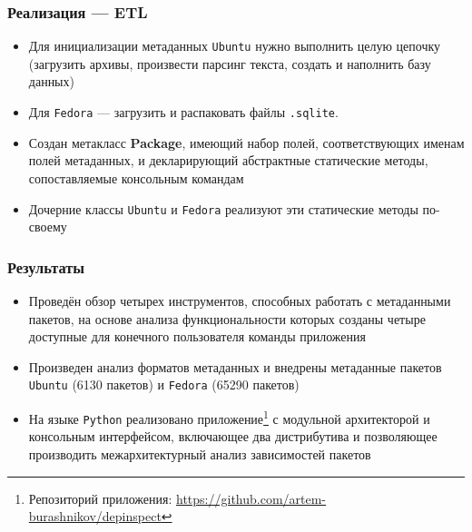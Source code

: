 \documentclass{beamer}
\begin{document}


\begin{frame}[t]
	\frametitle{Реализация --- ETL}
	\begin{itemize}
		\item Для инициализации метаданных \texttt{Ubuntu} нужно выполнить целую цепочку (загрузить архивы, произвести парсинг текста, создать и наполнить базу данных)
		\item Для \texttt{Fedora} --- загрузить и распаковать файлы \texttt{.sqlite}.
	\end{itemize}

	\begin{itemize}
		\item Создан метакласс \textbf{Package}, имеющий набор полей, соответствующих именам полей метаданных, и декларирующий абстрактные статические методы, сопоставляемые консольным командам
		\item Дочерние классы \texttt{Ubuntu} и \texttt{Fedora} реализуют эти статические методы по-своему
	\end{itemize}
\end{frame}

\begin{frame}
	\frametitle{Результаты}
	\begin{itemize}
		\item Проведён обзор четырех инструментов, способных работать с метаданными пакетов, на основе анализа функциональности которых созданы четыре доступные для конечного пользователя команды приложения
		\item Произведен анализ форматов метаданных и внедрены метаданные пакетов \texttt{Ubuntu} (6130 пакетов) и \texttt{Fedora} (65290 пакетов)
		\item На языке \texttt{Python} реализовано приложение\footnote{Репозиторий приложения: \href{https://github.com/artem-burashnikov/depinspect}{https://github.com/artem-burashnikov/depinspect}} с модульной архитекторой и консольным интерфейсом, включающее два дистрибутива и позволяющее производить межархитектурный анализ зависимостей пакетов
	\end{itemize}
\end{frame}


% 		
\end{document}
